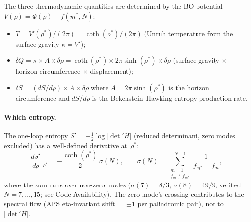 The three thermodynamic quantities are determined by
the BO potential $V(\rho) = \Phi(\rho) - f(m^*,N)$:
\begin{itemize}
\item $T = V'(\rho^*)/(2\pi) = \coth(\rho^*)/(2\pi)$
  (Unruh temperature from the surface gravity $\kappa = V'$);
\item $\delta Q = \kappa \times A \times \delta\rho
  = \coth(\rho^*) \times 2\pi\sinh(\rho^*) \times \delta\rho$
  (surface gravity $\times$ horizon circumference $\times$ displacement);
\item $\delta S = (dS/d\rho) \times A \times \delta\rho$
  where $A = 2\pi\sinh(\rho^*)$ is the horizon circumference and
  $dS/d\rho$ is the Bekenstein--Hawking entropy production rate.
\end{itemize}

\paragraph{Which entropy.}
The one-loop entropy $S' = -\tfrac{1}{2}\log|\det{}'H|$ (reduced
determinant, zero modes excluded) has a well-defined derivative
at~$\rho^*$:
\begin{equation}\label{eq:dS-spectral}
  \frac{dS'}{d\rho}\bigg|_{\rho^*}
  = -\frac{\coth(\rho^*)}{2}\,\sigma(N),
  \qquad
  \sigma(N) = \!\sum_{\substack{m=1 \\ f_m \ne f_{m^*}}}^{N-1}
  \frac{1}{f_{m^*} - f_m},
\end{equation}
where the sum runs over non-zero modes
($\sigma(7) = 8/3$, $\sigma(8) = 49/9$, verified $N = 7,\ldots,15$;
see Code Availability).
The zero mode's crossing contributes to the spectral flow
(APS eta-invariant shift $= \pm 1$ per palindromic pair),
not to $|{\det{}'H}|$.

